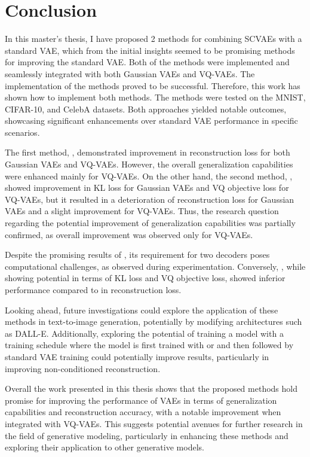\chapter{Conclusion}

In this master's thesis, I have proposed 2 methods for combining SCVAEs with a standard VAE, which from the initial insights seemed to be promising methods for improving the standard VAE. Both of the methods were implemented and seamlessly integrated with both Gaussian VAEs and VQ-VAEs. The implementation of the methods proved to be successful. Therefore, this work has shown how to implement both methods. The methods were tested on the MNIST, CIFAR-10, and CelebA datasets. Both approaches yielded notable outcomes, showcasing significant enhancements over standard VAE performance in specific scenarios.


The first method, , demonstrated improvement in reconstruction loss for both Gaussian VAEs and VQ-VAEs. However, the overall generalization capabilities were enhanced mainly for VQ-VAEs. On the other hand, the second method, , showed improvement in KL loss for Gaussian VAEs and VQ objective loss for VQ-VAEs, but it resulted in a deterioration of reconstruction loss for Gaussian VAEs and a slight improvement for VQ-VAEs. Thus, the research question regarding the potential improvement of generalization capabilities was partially confirmed, as overall improvement was observed only for VQ-VAEs.

Despite the promising results of , its requirement for two decoders poses computational challenges, as observed during experimentation. Conversely, , while showing potential in terms of KL loss and VQ objective loss, showed inferior performance compared to  in reconstruction loss.


Looking ahead, future investigations could explore the application of these methods in text-to-image generation, potentially by modifying architectures such as DALL-E. Additionally,
exploring the potential of training a model with a training schedule where the model is first trained with  or  and then followed by standard VAE training could potentially improve results, particularly in improving non-conditioned reconstruction.

Overall the work presented in this thesis shows that the proposed methods hold promise for improving the performance of VAEs in terms of generalization capabilities and reconstruction accuracy, with a notable improvement when integrated with VQ-VAEs. This suggests potential avenues for further research in the field of generative modeling, particularly in enhancing these methods and exploring their application to other generative models.


